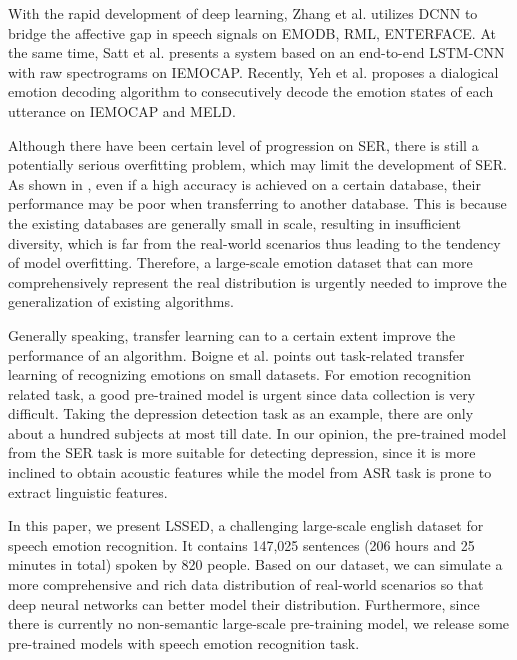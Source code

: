 \documentclass{article}
\begin{document}
With the rapid development of deep learning, Zhang et al. \cite{zhang2017speech} utilizes  DCNN to bridge the affective gap in speech signals on EMODB\cite{burkhardt2005database}, RML\cite{wang2008recognizing}, ENTERFACE\cite{martin2006enterface}.
At the same time, Satt et al. \cite{satt2017efficient} presents a system based on an end-to-end LSTM-CNN with raw spectrograms on IEMOCAP\cite{busso2008iemocap}.
Recently, Yeh et al.  \cite{yeh2020dialogical} proposes a dialogical emotion decoding algorithm to consecutively decode the emotion states of each utterance on IEMOCAP\cite{busso2008iemocap} and MELD\cite{poria2018meld}.



Although there have been certain level of  progression on SER, there is still a potentially serious overfitting problem, which may limit the development of SER.
As shown in \cite{zong2016cross, abdelwahab2018domain, liu2018unsupervised, luo2020nonnegative}, even if a high accuracy is achieved on a certain database, their performance may be poor when transferring to another database.
This is because the existing databases are generally small in scale, resulting in insufficient diversity, which is far from the real-world scenarios thus leading to the tendency of  model overfitting.
Therefore, a large-scale emotion dataset that can more comprehensively represent the real distribution is urgently needed to improve the generalization of existing algorithms.

Generally speaking, transfer learning can to a certain extent improve the performance of an algorithm.
Boigne et al. \cite{boigne2020recognizing} points out task-related transfer learning of recognizing emotions on small datasets.
For emotion recognition related task, a good pre-trained model is urgent since data collection is very difficult.
Taking the depression detection task as an example, there are only about a hundred subjects at most till date.
In our opinion, the pre-trained model from the SER task is more suitable for detecting depression, since it is more inclined to obtain acoustic features while the model from ASR task is prone to extract linguistic features.




In this paper, we present LSSED, a challenging large-scale english dataset for speech emotion recognition.
It contains 147,025 sentences (206 hours and 25 minutes in total) spoken by 820 people.
Based on our dataset, we can simulate a more comprehensive and rich data distribution of real-world scenarios so that deep neural networks can better model their distribution. 
Furthermore, since there is currently no non-semantic large-scale pre-training model, we release some pre-trained models with speech emotion recognition task.
\end{document}
